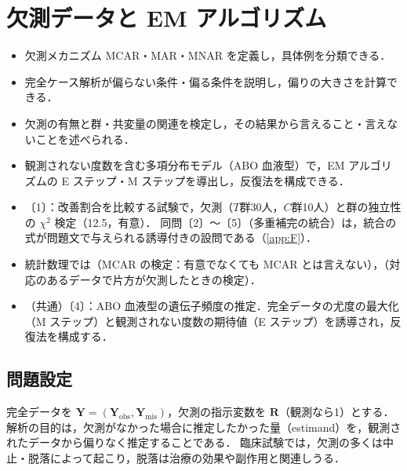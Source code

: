 \chapter{欠測データと EM アルゴリズム}\label{ch:16}

\begin{goalbox}
\begin{itemize}
\item 欠測メカニズム MCAR・MAR・MNAR を定義し，具体例を分類できる．
\item 完全ケース解析が偏らない条件・偏る条件を説明し，偏りの大きさを計算できる．
\item 欠測の有無と群・共変量の関連を検定し，その結果から言えること・言えないことを述べられる．
\item 観測されない度数を含む多項分布モデル（ABO 血液型）で，EM アルゴリズムの E ステップ・M ステップを導出し，反復法を構成できる．
\end{itemize}
\end{goalbox}

\begin{exambox}
\begin{itemize}
\item {}〔1〕：改善割合を比較する試験で，欠測（$T$群30人，$C$群10人）と群の独立性の $\chi^2$ 検定（12.5，有意）．
      同問〔2〕〜〔5〕（多重補完の統合）は，統合の式が問題文で与えられる誘導付きの設問である（\cref{app:F}）．
\item 統計数理では（MCAR の検定：有意でなくても MCAR とは言えない），（対応のあるデータで片方が欠測したときの検定）．
\item {}（共通）〔4〕：ABO 血液型の遺伝子頻度の推定．完全データの尤度の最大化（M ステップ）と観測されない度数の期待値（E ステップ）を誘導され，反復法を構成する．
\end{itemize}
\end{exambox}


\section{問題設定}\label{sec:16-setting}
完全データを $\bm Y=(\bm Y_{\mathrm{obs}},\bm Y_{\mathrm{mis}})$，欠測の指示変数を $\bm R$（観測なら1）とする．
解析の目的は，欠測がなかった場合に推定したかった量（estimand）を，観測されたデータから偏りなく推定することである．
臨床試験では，欠測の多くは中止・脱落によって起こり，脱落は治療の効果や副作用と関連しうる．

